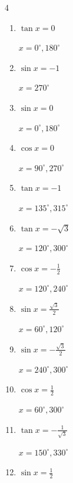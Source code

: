 \begin{multicols}{4}
\begin{enumerate}
        $\displaystyle x = 225^{\circ} , 315^{\circ}$

  \item $\displaystyle \tan{x}  = 0$

        $\displaystyle x = 0^{\circ} , 180^{\circ}$

\columnbreak %

  \item $\displaystyle \sin{x}  = -1$

        $\displaystyle x = 270^{\circ}$

  \item $\displaystyle \sin{x}  = 0$

        $\displaystyle x = 0^{\circ} , 180^{\circ}$

  \item $\displaystyle \cos{x}  = 0$

        $\displaystyle x = 90^{\circ} , 270^{\circ}$

  \item $\displaystyle \tan{x}  = -1$

        $\displaystyle x = 135^{\circ} , 315^{\circ}$

  \item $\displaystyle \tan{x}  = -\sqrt{3}$

        $\displaystyle x = 120^{\circ} , 300^{\circ}$

  \item $\displaystyle \cos{x}  = -\frac{1}{2}$

        $\displaystyle x = 120^{\circ} , 240^{\circ}$

  \item $\displaystyle \sin{x}  = \frac{\sqrt{3}}{2}$

        $\displaystyle x = 60^{\circ} , 120^{\circ}$

  \item $\displaystyle \sin{x}  = -\frac{\sqrt{3}}{2}$

        $\displaystyle x = 240^{\circ} , 300^{\circ}$

  \item $\displaystyle \cos{x}  = \frac{1}{2}$

        $\displaystyle x = 60^{\circ} , 300^{\circ}$

  \item $\displaystyle \tan{x}  = -\frac{1}{\sqrt{3}}$

        $\displaystyle x = 150^{\circ} , 330^{\circ}$

  \item $\displaystyle \sin{x}  = \frac{1}{2}$


\end{enumerate}
\end{multicols}
